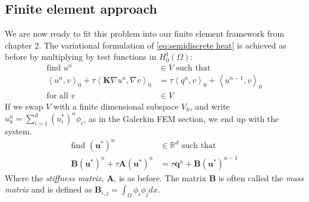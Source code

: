 \documentclass[../Main/main.tex]{subfiles}
\begin{document}
	\subsection*{Finite element approach}
	We are now ready to fit this problem into our finite element framework from chapter 2.
	The variational formulation of \eqref{eq:semidiscrete heat} is achieved as before by multiplying by test functions in $H^1_0(\Omega)$:
	\begin{equation}
		\begin{aligned}
			\text{find }u^n&\in V \text{ such that }\\
			\left \langle  u^n, v\right \rangle_0 + \tau \left \langle  \pmb{K} \nabla u^n, \nabla v \right \rangle_0 &=\tau \left \langle q^n,v\right \rangle_0 + \left \langle u^{n-1},v \right \rangle_0\\
			\text{for all }v&\in V
		\end{aligned}
	\end{equation}
	If we swap $V$ with  a finite dimensional subspace $V_h$, and write $u_h^n = \sum_{i = 1}^d (u_i^*)^n \phi_i $, as in the Galerkin FEM section, we end up with the system.
	\begin{equation}\label{eq:heat fem disc}
		\begin{aligned}
			\text{find }(\pmb{u}^*)^n&\in \mathbb{R}^d \text{ such that }\\
			\pmb{B}(\pmb{u}^*)^n+\tau\pmb{A}(\pmb{u}^*)^n &=\tau \pmb{q}^n +  \pmb{B}(\pmb{u}^*)^{n-1}
		\end{aligned}
	\end{equation}
	Where the \emph{stiffness matrix}, $\pmb{A}$, is as before. The matrix $\pmb{B}$ is often called the \emph{mass matrix} and is defined as $\pmb{B}_{i,j} = \int_{\Omega} \phi_i \phi_jdx$.
\end{document}
